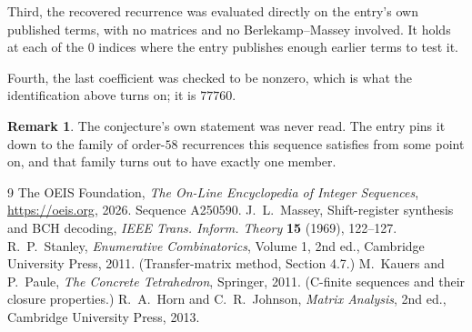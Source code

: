 \documentclass[11pt,a4paper]{article}
\theoremstyle{plain}
\theoremstyle{definition}
\newtheorem{remark}[theorem]{Remark}
\begin{document}
Third, the recovered recurrence was evaluated directly on the entry's own published terms, with
no matrices and no Berlekamp--Massey involved. It holds at each of the $0$ indices where
the entry publishes enough earlier terms to test it.

Fourth, the last coefficient was checked to be nonzero, which is what the identification above
turns on; it is $77760$.

\begin{remark}
The conjecture's own statement was never read. The entry pins it down to the family of
order-$58$ recurrences this sequence satisfies from some point on, and that family turns
out to have exactly one member.
\end{remark}

\begin{thebibliography}{9}
 The OEIS Foundation, \emph{The On-Line Encyclopedia of Integer
Sequences}, \url{https://oeis.org}, 2026. Sequence A250590.
 J.~L.~Massey, Shift-register synthesis and BCH decoding, \emph{IEEE
Trans. Inform. Theory} \textbf{15} (1969), 122--127.
 R.~P.~Stanley, \emph{Enumerative Combinatorics}, Volume 1, 2nd ed.,
Cambridge University Press, 2011. (Transfer-matrix method, Section 4.7.)
 M.~Kauers and P.~Paule, \emph{The Concrete Tetrahedron}, Springer, 2011.
(C-finite sequences and their closure properties.)
 R.~A.~Horn and C.~R.~Johnson, \emph{Matrix Analysis}, 2nd ed., Cambridge
University Press, 2013.
\end{thebibliography}
\end{document}
